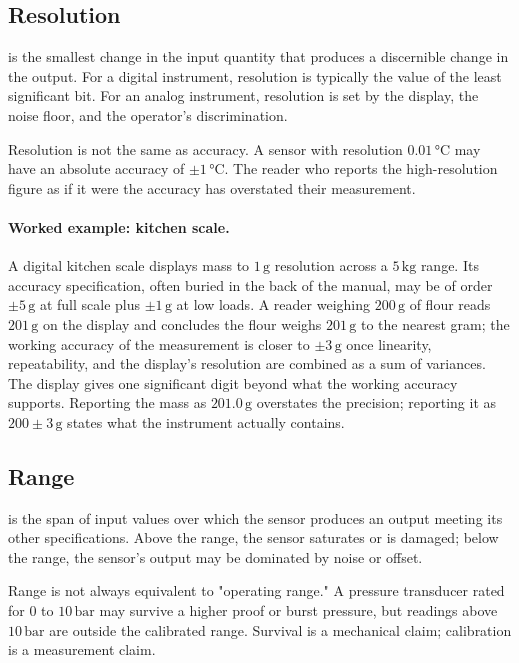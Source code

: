 \subsection{Resolution}

 is the smallest change in the input quantity
that produces a discernible change in the output. For a digital
instrument, resolution is typically the value of the least
significant bit. For an analog instrument, resolution is set by the
display, the noise floor, and the operator's discrimination.

Resolution is not the same as accuracy. A sensor with resolution
$0.01 \,\si{\degreeCelsius}$ may have an absolute accuracy of
$\pm 1 \,\si{\degreeCelsius}$. The reader who reports the
high-resolution figure as if it were the accuracy has overstated
their measurement.

\paragraph{Worked example: kitchen scale.} A digital kitchen scale
displays mass to $1 \,\si{\gram}$ resolution across a $5 \,\si
{\kilogram}$ range. Its accuracy specification, often buried in the
back of the manual, may be of order $\pm 5 \,\si{\gram}$ at full
scale plus $\pm 1 \,\si{\gram}$ at low loads. A reader weighing
$200 \,\si{\gram}$ of flour reads $201 \,\si{\gram}$ on the display
and concludes the flour weighs $201 \,\si{\gram}$ to the nearest
gram; the working accuracy of the measurement is closer to
$\pm 3 \,\si{\gram}$ once linearity, repeatability, and the
display's resolution are combined as a sum of variances. The
display gives one significant digit beyond what the working
accuracy supports. Reporting the mass as $201.0 \,\si{\gram}$
overstates the precision; reporting it as $200 \pm 3 \,\si{\gram}$
states what the instrument actually contains.

\subsection{Range}

 is the span of input values over which the sensor
produces an output meeting its other specifications. Above the
range, the sensor saturates or is damaged; below the range, the
sensor's output may be dominated by noise or offset.

Range is not always equivalent to "operating range." A pressure
transducer rated for $0$ to $10\,\text{bar}$ may survive a higher
proof or burst pressure, but readings above $10\,\text{bar}$ are
outside the calibrated range. Survival is a mechanical claim;
calibration is a measurement claim.

